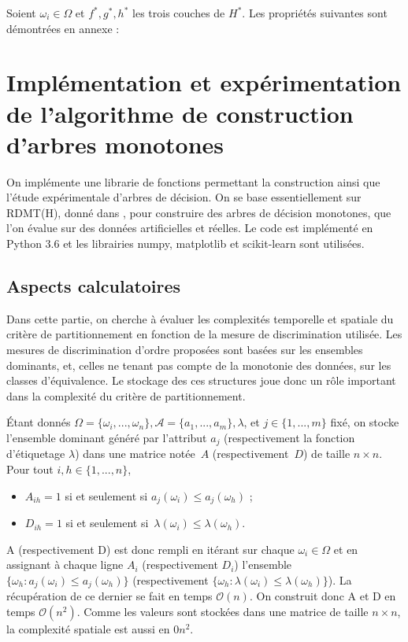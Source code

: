 \documentclass[a4paper]{article}
\begin{document}
Soient $\omega_i \in \Omega$ et $f^*, g^*, h^*$ les trois couches de $H^*$. Les propriétés suivantes sont
démontrées en annexe :


\section{Implémentation et expérimentation de l'algorithme de construction
d'arbres monotones} 
On implémente une librarie de fonctions permettant la
construction ainsi que l'étude expérimentale d'arbres de décision.  On se base
essentiellement sur RDMT(H), donné dans \cite{marsala-rank}, pour construire des
arbres de décision monotones, que l'on évalue sur des données artificielles et
réelles. Le code est implémenté en Python 3.6 et les librairies numpy,
matplotlib et scikit-learn sont utilisées.

\subsection{Aspects calculatoires}
Dans cette partie, on cherche à évaluer les complexités temporelle et spatiale
du critère de partitionnement en fonction de la mesure de discrimination
utilisée. Les mesures de discrimination d'ordre proposées sont basées sur les
ensembles dominants, et, celles ne tenant pas compte de la monotonie des données,
sur les classes d'équivalence. Le stockage des ces structures joue donc un rôle
important dans la complexité du critère de partitionnement.

Étant donnés $\Omega = \{\omega_i, ... , \omega_n\}, \mathcal{A} = \{a_1, ...,
a_m\}, \lambda$, et $j \in \{1, ..., m\}$ fixé, on stocke l'ensemble dominant
généré par l'attribut $a_j$ (respectivement la fonction d'étiquetage $\lambda$)
dans une matrice notée~$A$ (respectivement~$D$) de taille $n \times n$. Pour tout $i,
h \in \{1, ..., n\}$,
\begin{itemize} \item $A_{ih} = 1$ si et seulement si $a_j(\omega_i) \leq
a_j(\omega_h)$ ;
        \item $D_{ih}= 1$ si et seulement si~$\lambda(\omega_i)
\leq \lambda(\omega_h)$.
\end{itemize}

A (respectivement D) est donc rempli en itérant sur chaque $\omega_i \in \Omega$
et en assignant à chaque ligne $A_i$ (respectivement $D_i$) l'ensemble
$\{\omega_h : a_j(\omega_i) \leq a_j(\omega_h)\}$ (respectivement $\{\omega_h :
\lambda(\omega_i) \leq \lambda(\omega_h)\}$). La récupération de ce dernier se
fait en temps $\mathcal{O}(n)$. On construit donc A et D en temps
$\mathcal{O}(n^2)$. Comme les valeurs sont stockées dans une matrice de taille
$n \times n$, la complexité spatiale est aussi en $\mathcal{0}{n^2}$.\\
\end{document}
